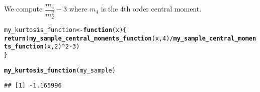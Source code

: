 \documentclass[11pt, a4paper]{article}\usepackage[]{graphicx}\usepackage[]{xcolor}
\makeatletter
\newcommand{\hlnum}[1]{\textcolor[rgb]{0.686,0.059,0.569}{#1}}%
\newcommand{\hlopt}[1]{\textcolor[rgb]{0,0,0}{#1}}%
\newcommand{\hldef}[1]{\textcolor[rgb]{0.345,0.345,0.345}{#1}}%
\newcommand{\hlkwa}[1]{\textcolor[rgb]{0.161,0.373,0.58}{\textbf{#1}}}%
\newcommand{\hlkwb}[1]{\textcolor[rgb]{0.69,0.353,0.396}{#1}}%
\newcommand{\hlkwc}[1]{\textcolor[rgb]{0.333,0.667,0.333}{#1}}%
\newcommand{\hlkwd}[1]{\textcolor[rgb]{0.737,0.353,0.396}{\textbf{#1}}}%
\newenvironment{kframe}{%
 \def\at@end@of@kframe{}%
 \ifinner\ifhmode%
  \def\at@end@of@kframe{\end{minipage}}%
  \begin{minipage}{\columnwidth}%
 \fi\fi%
 \def\FrameCommand##1{\hskip\@totalleftmargin \hskip-\fboxsep
 \colorbox{shadecolor}{##1}\hskip-\fboxsep
     \hskip-\linewidth \hskip-\@totalleftmargin \hskip\columnwidth}%
 \MakeFramed {\advance\hsize-\width
   \@totalleftmargin\z@ \linewidth\hsize
   \@setminipage}}%
 {\par\unskip\endMakeFramed%
 \at@end@of@kframe}
\newenvironment{knitrout}{}{} %
\makeatother
\begin{document}
We compute $\dfrac{m_4}{m_2^2} - 3$ where $m_4$ is the 4th order central moment.
\begin{knitrout}\footnotesize
{}\color{fgcolor}\begin{kframe}
\begin{alltt}
\hldef{my_kurtosis_function} \hlkwb{<-} \hlkwa{function}\hldef{(}\hlkwc{x}\hldef{)\{}
  \hlkwd{return}\hldef{(}\hlkwd{my_sample_central_moments_function}\hldef{(x,} \hlnum{4}\hldef{)} \hlopt{/} \hlkwd{my_sample_central_moments_function}\hldef{(x,} \hlnum{2}\hldef{)}\hlopt{^}\hlnum{2} \hlopt{-} \hlnum{3}\hldef{)}
\hldef{\}}
\end{alltt}
\end{kframe}
\end{knitrout}

\begin{knitrout}\footnotesize
{}\color{fgcolor}\begin{kframe}
\begin{alltt}
\hlkwd{my_kurtosis_function}\hldef{(my_sample)}
\end{alltt}
\begin{verbatim}
## [1] -1.165996
\end{verbatim}
\end{kframe}
\end{knitrout}
\end{document}
